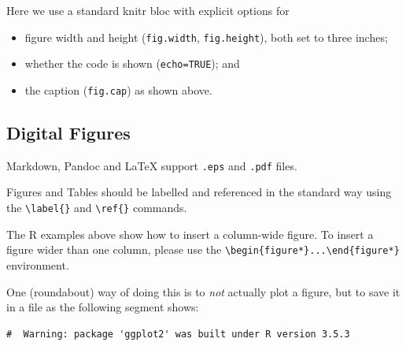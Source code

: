 \documentclass[letterpaper,9pt,twocolumn,twoside,]{pinp}
\providecommand{\tightlist}{%
  \setlength{\itemsep}{0pt}\setlength{\parskip}{0pt}}
\begin{document}
Here we use a standard knitr bloc with explicit options for

\begin{itemize}
\tightlist
\item
  figure width and height (\texttt{fig.width}, \texttt{fig.height}),
  both set to three inches;
\item
  whether the code is shown (\texttt{echo=TRUE}); and
\item
  the caption (\texttt{fig.cap}) as shown above.
\end{itemize}

\hypertarget{digital-figures}{%
\subsection{Digital Figures}\label{digital-figures}}

Markdown, Pandoc and LaTeX support \texttt{.eps} and \texttt{.pdf}
files.

Figures and Tables should be labelled and referenced in the standard way
using the \texttt{\textbackslash{}label\{\}} and
\texttt{\textbackslash{}ref\{\}} commands.

The R examples above show how to insert a column-wide figure. To insert
a figure wider than one column, please use the
\texttt{\textbackslash{}begin\{figure*\}...\textbackslash{}end\{figure*\}}
environment.

One (roundabout) way of doing this is to \emph{not} actually plot a
figure, but to save it in a file as the following segment shows:

\begin{Shaded}
\begin{Highlighting}[]
\end{Highlighting}
\end{Shaded}

\begin{ShadedResult}
\begin{verbatim}
#  Warning: package 'ggplot2' was built under R version 3.5.3
\end{verbatim}
\end{ShadedResult}

\begin{Shaded}
\begin{Highlighting}[]
\StringTok{ }\NormalTok{(}
             \NormalTok{(}
                          \OperatorTok{+}
\StringTok{    }\NormalTok{(} \NormalTok{)}
\NormalTok{(}\NormalTok{(}
\end{Highlighting}
\end{Shaded}
\end{document}
